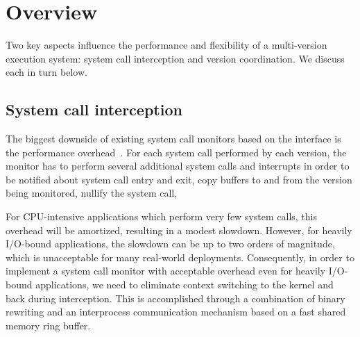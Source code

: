 \section{Overview}
\label{sec:overview}

Two key aspects influence the performance and flexibility of a multi-version
execution system: system call interception and version coordination.  We discuss
each in turn below.

\subsection{System call interception}
\label{sec:interception}


The biggest downside of existing system call monitors based on the
\ptrace interface is the performance
overhead~\cite{cox2006,orchestra09,tachyon12,mx}.  For each system
call performed by each version, the monitor has to perform several
additional system calls and interrupts in order to be notified about
system call entry and exit, copy buffers to and from the version being
monitored, nullify the system call, \etc

For CPU-intensive applications which perform very few system calls,
this overhead will be amortized, resulting in a modest
slowdown. However, for heavily I/O-bound applications,
the slowdown can be up to two orders of magnitude, which is
unacceptable for many real-world deployments.
%
Consequently, in order to implement a system call monitor with
acceptable overhead even for heavily I/O-bound applications, we need
to eliminate context switching to the kernel and back during
interception.  This is accomplished through a combination of binary
rewriting and an interprocess communication mechanism based on a
fast shared memory ring buffer.

